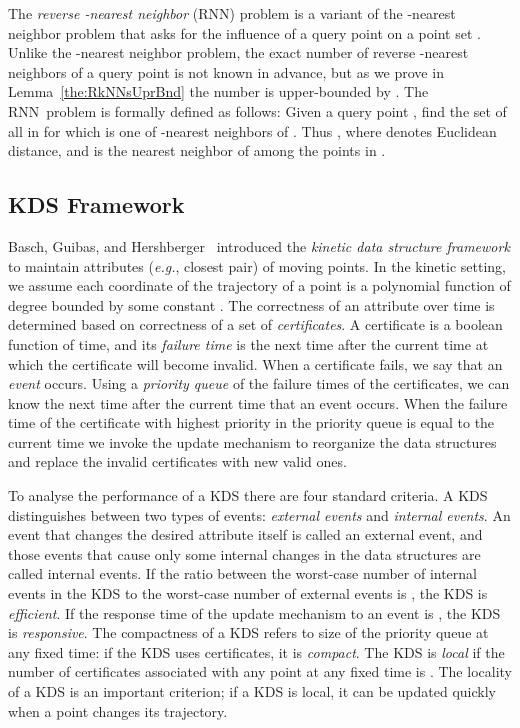 \documentclass[preprint,12pt]{elsarticle}
\def\rknn{\mbox{RNN}}
\newcommand{\eg}{\emph{e.g.}}
\begin{document}
The \textit{reverse -nearest neighbor} (\rknn) problem is a variant of the -nearest neighbor problem that asks for the influence of a query point on a point set . Unlike the -nearest neighbor problem, the exact number of reverse -nearest neighbors of a query point is not known in advance, but as we prove in Lemma~\ref{the:RkNNsUprBnd} the number is upper-bounded by . The \rknn~problem is formally defined as follows: Given a query point , find the set  of all  in  for which  is one of -nearest neighbors of . Thus , where  denotes Euclidean distance, and  is the  nearest neighbor of  among the points in .

\subsection{KDS Framework}\label{sec:KDSframework}
Basch, Guibas, and Hershberger~\cite{Basch:1997:DSM:314161.314435} introduced the \textit{kinetic data structure framework} to maintain attributes (\eg, closest pair) of moving points. In the kinetic setting, we assume each coordinate of the trajectory of a point  is a polynomial function of degree bounded by some constant . The correctness of an attribute over time is determined based on correctness of a set of \textit{certificates}. A certificate is a boolean function of time, and its \textit{failure time} is the next time after the current time at which the certificate will become invalid. When a certificate fails, we say that an \textit{event} occurs. Using a \textit{priority queue} of the failure times of the certificates, we can know the next time after the current time that an event occurs. When the failure time of the certificate with highest priority in the priority queue is equal to the current time we invoke the update mechanism to reorganize the data structures and replace the invalid certificates with new valid ones. 

To analyse the performance of a KDS there are four standard criteria. A KDS distinguishes between two types of events: \textit{external events} and \textit{internal events}. An event that changes the desired attribute itself is called an external event, and those events that cause only some internal changes in the data structures are called internal events. If the ratio between the  worst-case number of internal events in the KDS to the worst-case number of external events is , the KDS is \textit{efficient}. If the response time of the update mechanism to an event is , the KDS is \textit{responsive}. The compactness of a KDS refers to size of the priority queue at any fixed time: if the KDS uses  certificates, it is \textit{compact}. The KDS is \textit{local} if the number of certificates associated with any point at any fixed time is . The locality of a KDS is an important criterion; if a KDS is local, it can be updated quickly when a point changes its trajectory.
\end{document}
